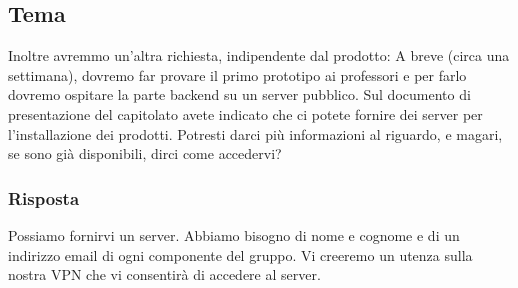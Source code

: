 \subsection*{Tema}
Inoltre avremmo un'altra richiesta, indipendente dal prodotto:
A breve (circa una settimana), dovremo far provare il primo prototipo ai professori e per farlo dovremo ospitare la parte backend su un server pubblico. Sul documento di presentazione del capitolato avete indicato che ci potete fornire dei server per l'installazione dei prodotti. Potresti darci più informazioni al riguardo, e magari, se sono già disponibili, dirci come accedervi?
\subsubsection{Risposta}
Possiamo fornirvi un server. Abbiamo bisogno di nome e cognome e di un indirizzo email di ogni componente del gruppo. Vi creeremo un utenza sulla nostra VPN che vi consentirà di accedere al server.





